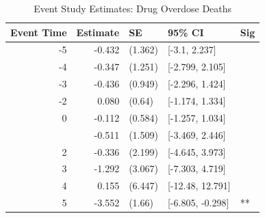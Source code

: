 \begin{table}[!h]
\centering
\caption{\label{tab:tab:event_study}Event Study Estimates: Drug Overdose Deaths}
\centering
\begin{tabular}[t]{rrlll}
\toprule
Event Time & Estimate & SE & 95\% CI & Sig\\
\midrule
-5 & -0.432 & (1.362) & {}[-3.1, 2.237] & \\
-4 & -0.347 & (1.251) & {}[-2.799, 2.105] & \\
-3 & -0.436 & (0.949) & {}[-2.296, 1.424] & \\
-2 & 0.080 & (0.64) & {}[-1.174, 1.334] & \\
0 & -0.112 & (0.584) & {}[-1.257, 1.034] & \\
\addlinespace
1 & -0.511 & (1.509) & {}[-3.469, 2.446] & \\
2 & -0.336 & (2.199) & {}[-4.645, 3.973] & \\
3 & -1.292 & (3.067) & {}[-7.303, 4.719] & \\
4 & 0.155 & (6.447) & {}[-12.48, 12.791] & \\
5 & -3.552 & (1.66) & {}[-6.805, -0.298] & **\\
\bottomrule
\end{tabular}
\end{table}
